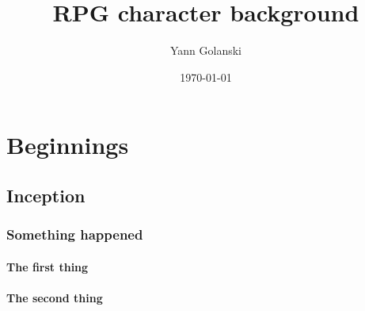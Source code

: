 \usepackage{lipsum}

\usepackage{hyperref}
\usepackage{longtable}

\usepackage{tabu}

\usepackage{booktabs}

\usepackage{graphicx}

\usepackage{verbatim} %

\title{RPG character background}
\date{\today}
\author{Yann Golanski}


\frontmatter
\maketitle
\tableofcontents

\mainmatter

\part{Beginnings}

\chapter{Inception}



\lipsum[1]

\lipsum[2]

\section{Something happened}

\subsection{The first thing}

\lipsum[3]

\lipsum[4]

\subsection{The second thing}

